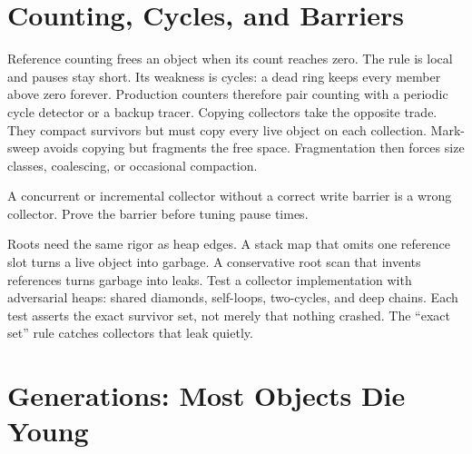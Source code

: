 \section{Counting, Cycles, and Barriers}\label{sec:ch33-counting}

Reference counting frees an object when its count reaches zero.
The rule is local and pauses stay short.
Its weakness is cycles: a dead ring keeps every member above zero forever.
Production counters therefore pair counting with a periodic cycle detector or a backup tracer.
Copying collectors take the opposite trade.
They compact survivors but must copy every live object on each collection.
Mark-sweep avoids copying but fragments the free space.
Fragmentation then forces size classes, coalescing, or occasional compaction.
\begin{ccwarning}
A concurrent or incremental collector without a correct write barrier is a wrong collector.
Prove the barrier before tuning pause times.
\end{ccwarning}
Roots need the same rigor as heap edges.
A stack map that omits one reference slot turns a live object into garbage.
A conservative root scan that invents references turns garbage into leaks.
Test a collector implementation with adversarial heaps: shared diamonds, self-loops, two-cycles, and deep chains.
Each test asserts the exact survivor set, not merely that nothing crashed.
The \enquote{exact set} rule catches collectors that leak quietly.

\section{Generations: Most Objects Die Young}\label{sec:ch33-generations}

